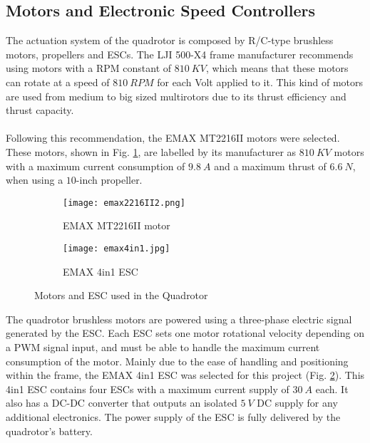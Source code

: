 \subsection{Motors and Electronic Speed Controllers}
The actuation system of the quadrotor is composed by R/C-type brushless motors, propellers and ESCs. The LJI 500-X4 frame manufacturer recommends using motors with a RPM constant of $810\ KV$, which means that these motors can rotate at a speed of $810\ RPM$ for each Volt applied to it. This kind of motors are used from medium to big sized multirotors due to its thrust efficiency and thrust capacity.
\\\\
Following this recommendation, the EMAX MT2216II motors were selected. These motors, shown in Fig. \ref{fig:emaxmotor}, are labelled by its manufacturer as $810\ KV$ motors with a maximum current consumption of $9.8\ A$ and a maximum thrust of $6.6\ N$, when using a $10$-inch propeller.
\begin{figure}[H]
\begin{subfigure}{.5\linewidth}
\centering
\texttt{[image: emax2216II2.png]}    
\caption{EMAX MT2216II motor} 
\label{fig:emaxmotor}
\end{subfigure}
\begin{subfigure}{.5\linewidth}
\centering
\texttt{[image: emax4in1.jpg]}    
\caption{EMAX 4in1 ESC} 
\label{fig:emaxESC}
\end{subfigure}
\caption{Motors and ESC used in the Quadrotor\protect\footnotemark}
\label{fig:motorandesc}
\end{figure}
The quadrotor brushless motors are powered using a three-phase electric signal generated by the ESC. Each ESC sets one motor rotational velocity depending on a PWM signal input, and must be able to handle the maximum current consumption of the motor. Mainly due to the ease of handling and positioning within the frame, the EMAX 4in1 ESC was selected for this project (Fig. \ref{fig:emaxESC}). This 4in1 ESC contains four ESCs with a maximum current supply of $30\ A$ each. It also has a DC-DC converter that outputs an isolated $5\ V$ DC supply for any additional electronics. The power supply of the ESC is fully delivered by the quadrotor's battery.

